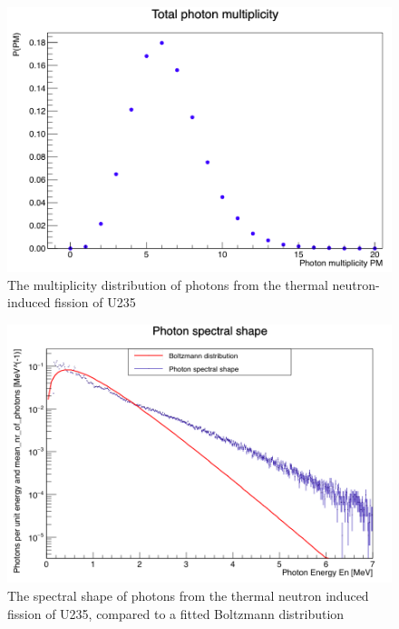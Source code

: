 \documentclass[]{article}
\begin{document}
\begin{figure} [H]
	\centering
	\includegraphics[scale=0.36]{U235_ph_mult.png}
	\caption{The multiplicity distribution of photons from the thermal neutron-induced fission of U235}
	\label{fig:U235_ph_mult}
\end{figure}

\begin{figure} [H]
	\centering
	\includegraphics[scale=0.34]{U235_ph_spectral_shape.png}
	\caption{The spectral shape of photons from the thermal neutron induced fission of U235, compared to a fitted Boltzmann distribution}
	\label{fig:U235_ph_spectral_shape}
\end{figure}
\end{document}
